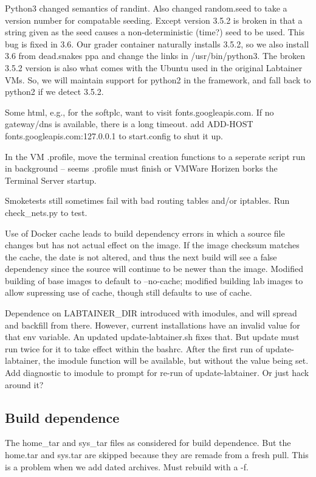 \documentclass[12pt]{article}
\begin{document}
Python3 changed semantics of randint.  Also changed random.seed to take a version number for compatable seeding.
Except version 3.5.2 is broken in that a string given as the seed causes a non-deterministic (time?) seed to be used.
This bug is fixed in 3.6.  Our grader container naturally installs 3.5.2, so we also install 3.6 from dead.snakes ppa
and change the links in /usr/bin/python3. The broken 3.5.2 version is also what comes with the Ubuntu used in the original
Labtainer VMs.  So, we will maintain support for python2 in the framework, and fall back to python2 if we detect 3.5.2.

Some html, e.g., for the softplc, want to visit fonts.googleapis.com.  If no gateway/dns is available, there is a long timeout.
add         ADD-HOST fonts.googleapis.com:127.0.0.1 to start.config to shut it up.

In the VM .profile, move the terminal creation functions to a seperate script run in background -- seems .profile must finish or VMWare Horizen 
borks the Terminal Server startup.

Smoketests still sometimes fail with bad routing tables and/or iptables.  Run check\_nets.py to test.

Use of Docker cache leads to build dependency errors in which a source file changes but has not actual effect on the image.  If the image
checksum matches the cache, the date is not altered, and thus the next build will see a false dependency since the source will continue to
be newer than the image.  Modified building of base images to default to --no-cache; modified building lab images to allow supressing use of cache,
though still defaults to use of cache.

Dependence on LABTAINER\_DIR introduced with imodules, and will spread and backfill from there.  However, current installations have an invalid
value for that env variable.  An updated update-labtainer.sh fixes that.  But update must run twice for it to take effect within the bashrc.
After the first run of update-labtainer, the imodule function will be available, but without the value being set.  Add diagnostic to imodule to
prompt for re-run of update-labtainer.  Or just hack around it?

\subsection {Build dependence}
The home\_tar and sys\_tar files as considered for build dependence.  But the home.tar and sys.tar are skipped because they are remade
from a fresh pull.  This is a problem when we add dated archives.  Must rebuild with a -f.
\end{document}
